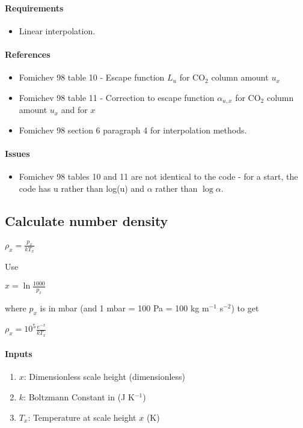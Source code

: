    \paragraph{Requirements}
   \begin{itemize}   
   \item Linear interpolation. 
   \end{itemize}   

   \paragraph{References}
   \begin{itemize}
   \item Fomichev 98 table 10 - Escape function $L_u$ for CO$_2$ column 
     amount $u_x$
   \item Fomichev 98 table 11 - Correction to escape function $\alpha_{u,x}$ 
     for CO$_2$ column amount $u_x$ and for $x$ 
   \item Fomichev 98 section 6 paragraph 4 for interpolation methods.
   \end{itemize}

   \paragraph{Issues}
   \begin{itemize}
   \item Fomichev 98 tables 10 and 11 are not identical to the code - for
     a start, the code has u rather than log(u) and $\alpha$ rather than
     $\log \alpha$.
   \end{itemize}


\subsection{Calculate number density}

   $\rho_x = \frac{p_x}{kT_x}$

   \noindent Use
   
   \noindent $x = \ln \frac{1000}{p_x}$
   
   \noindent where $p_x$ is in mbar (and 1 mbar = 100 Pa = 100 kg m$^{-1}$ s$^{-2}$) to get
   
   \noindent $\rho_x = 10^5 \frac{e^{-x}}{kT_x}$
   
   \paragraph{Inputs}
   \begin{enumerate}
   \item $x$: Dimensionless scale height (dimensionless)
   \item $k$: Boltzmann Constant in (J K$^{-1}$)
   \item $T_x$: Temperature at scale height $x$ (K)
   \end{enumerate}


